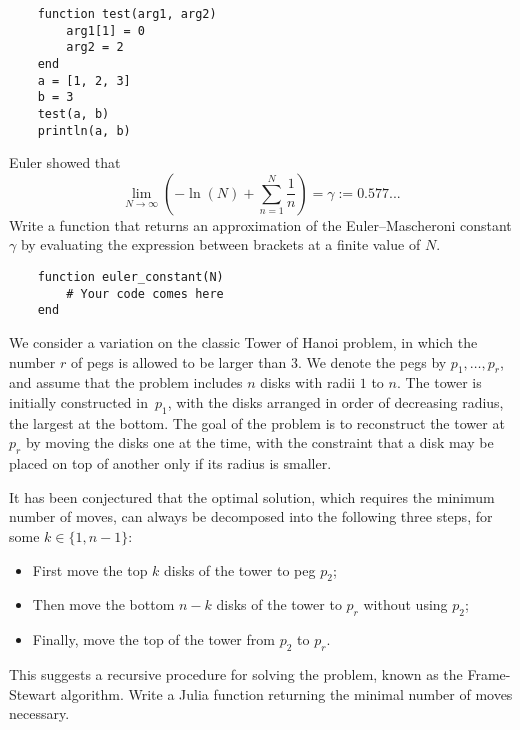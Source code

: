 \begin{verbatim}
    function test(arg1, arg2)
        arg1[1] = 0
        arg2 = 2
    end
    a = [1, 2, 3]
    b = 3
    test(a, b)
    println(a, b)
\end{verbatim}


\begin{task}
    Euler showed that
    \[
        \lim_{N \to \infty} \left( - \ln(N) + \sum_{n=1}^{N} \frac{1}{n} \right) = \gamma := 0.577...
    \]
    Write a function that returns an approximation of the Euler--Mascheroni constant $\gamma$ by evaluating the expression between brackets at a finite value of $N$.
    \begin{verbatim}
    function euler_constant(N)
        # Your code comes here
    end
    \end{verbatim}
\end{task}

\begin{task}
    We consider a variation on the classic Tower of Hanoi problem,
    in which the number $r$ of pegs is allowed to be larger than 3.
    We denote the pegs by $p_1, \dots, p_r$,
    and assume that the problem includes $n$ disks with radii $1$ to $n$.
    The tower is initially constructed in~$p_1$,
    with the disks arranged in order of decreasing radius, the largest at the bottom.
    The goal of the problem is to reconstruct the tower at $p_r$ by moving the disks one at the time,
    with the constraint that a disk may be placed on top of another only if its radius is smaller.

    It has been conjectured that the optimal solution,
    which requires the minimum number of moves,
    can always be decomposed into the following three steps,
    for some $k \in \{1, n-1\}$:
    \begin{itemize}
        \item First move the top $k$ disks of the tower to peg $p_2$;
        \item Then move the bottom $n-k$ disks of the tower to $p_r$ without using $p_2$;
        \item Finally, move the top of the tower from $p_2$ to $p_r$.
    \end{itemize}
    This suggests a recursive procedure for solving the problem, known as the Frame-Stewart algorithm.
    Write a Julia function  returning the minimal number of moves necessary.

\end{task}


